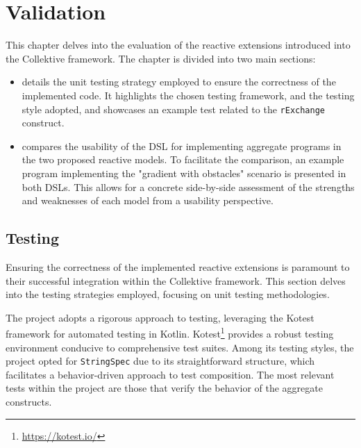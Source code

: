 
\chapter{Validation}
\label{chap:evaluation}

This chapter delves into the evaluation of the reactive extensions introduced into the Collektive framework. The chapter is divided into two main sections:

\begin{itemize}
    \item {} details the unit testing strategy employed to ensure the correctness of the implemented code. It highlights the chosen testing framework, and the testing style adopted, and showcases an example test related to the \texttt{rExchange} construct.
    \item {} compares the usability of the DSL for implementing aggregate programs in the two proposed reactive models. To facilitate the comparison, an example program implementing the "gradient with obstacles" scenario is presented in both DSLs. This allows for a concrete side-by-side assessment of the strengths and weaknesses of each model from a usability perspective.
\end{itemize}

\section{Testing}
\label{section:testing}

Ensuring the correctness of the implemented reactive extensions is paramount to their successful integration within the Collektive framework. This section delves into the testing strategies employed, focusing on unit testing methodologies.

The project adopts a rigorous approach to testing, leveraging the Kotest framework for automated testing in Kotlin. Kotest\footnote{\url{https://kotest.io/}} provides a robust testing environment conducive to comprehensive test suites. Among its testing styles, the project opted for \texttt{StringSpec} due to its straightforward structure, which facilitates a behavior-driven approach to test composition. The most relevant tests within the project are those that verify the behavior of the aggregate constructs.

